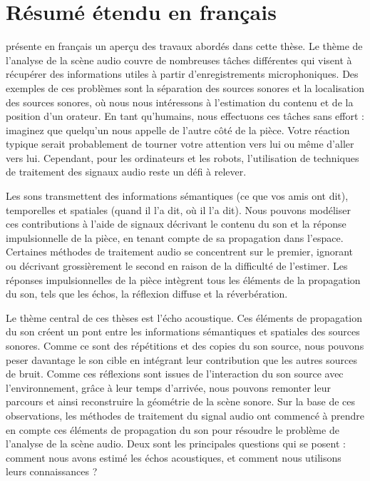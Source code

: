 \chapter*{Résumé étendu en français}

 présente en français un aperçu des travaux abordés dans cette thèse.
Le thème de l'analyse de la scène audio couvre de nombreuses tâches différentes qui visent à récupérer des informations utiles à partir d'enregistrements microphoniques.
Des exemples de ces problèmes sont la séparation des sources sonores et la localisation des sources sonores, où nous nous intéressons à l'estimation du contenu et de la position d'un orateur.
En tant qu'humains, nous effectuons ces tâches sans effort : imaginez que quelqu'un nous appelle de l'autre côté de la pièce. Votre réaction typique serait probablement de tourner votre attention vers lui ou même d'aller vers lui.
Cependant, pour les ordinateurs et les robots, l'utilisation de techniques de traitement des signaux audio reste un défi à relever.

\mynewline
Les sons transmettent des informations sémantiques (ce que vos amis ont dit), temporelles et spatiales (quand il l'a dit, où il l'a dit).
Nous pouvons modéliser ces contributions à l'aide de signaux décrivant le contenu du son et la réponse impulsionnelle de la pièce, en tenant compte de sa propagation dans l'espace. Certaines méthodes de traitement audio se concentrent sur le premier, ignorant ou décrivant grossièrement le second en raison de la difficulté de l'estimer.
Les réponses impulsionnelles de la pièce intègrent tous les éléments de la propagation du son, tels que les échos, la réflexion diffuse et la réverbération.

\mynewline
Le thème central de ces thèses est l'écho acoustique. Ces éléments de propagation du son créent un pont entre les informations sémantiques et spatiales des sources sonores. Comme ce sont des répétitions et des copies du son source, nous pouvons peser davantage le son cible en intégrant leur contribution que les autres sources de bruit.
Comme ces réflexions sont issues de l'interaction du son source avec l'environnement, grâce à leur temps d'arrivée, nous pouvons remonter leur parcours et ainsi reconstruire la géométrie de la scène sonore.
Sur la base de ces observations, les méthodes de traitement du signal audio ont commencé à prendre en compte ces éléments de propagation du son pour résoudre le problème de l'analyse de la scène audio.
Deux sont les principales questions qui se posent :
comment nous avons estimé les échos acoustiques, et comment nous utilisons leurs connaissances ?

